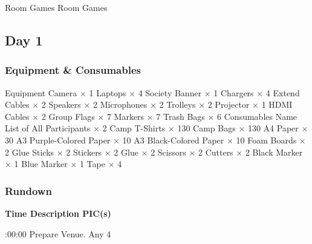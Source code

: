
\bTR\bTD\schetimee{\currentTABLErow}
\eTD\bTD[nr=4] Room Games
\eTD\bTD[nr=4] Room Games
\eTD\eTR


\eTABLEbody
\eTABLE

\pagebreak
\subsection{Day 1}

\subsubsection{Equipment \& Consumables}
\starttabulate[|l|l|]
\NC{}Equipment\NC\NR
\HL
\NC Camera \NC $\times$ 1 \NR
\NC Laptops \NC $\times$ 4 \NR
\NC Society Banner \NC $\times$ 1 \NR
\NC Chargers \NC $\times$ 4 \NR
\NC Extend Cables \NC $\times$ 2 \NR
\NC Speakers \NC $\times$ 2 \NR
\NC Microphones \NC $\times$ 2 \NR
\NC Trolleys \NC $\times$ 2 \NR
\NC Projector \NC $\times$ 1 \NR
\NC HDMI Cables \NC $\times$ 2 \NR
\NC Group Flags \NC $\times$ 7 \NR
\NC Markers \NC $\times$ 7 \NR
\NC Trash Bags \NC $\times$ 6 \NR
\HL
\NR
\NC{}Consumables\NC\NR
\HL
\NC Name List of All Participants \NC $\times$ 2 \NR
\NC Camp T-Shirts \NC $\times$ 130 \NR
\NC Camp Bags \NC $\times$ 130 \NR
\NC A4 Paper \NC $\times$ 30 \NR
\NC A3 Purple-Colored Paper \NC $\times$ 10 \NR
\NC A3 Black-Colored Paper \NC $\times$ 10 \NR
\NC Foam Boards \NC $\times$ 2 \NR
\NC Glue Sticks \NC $\times$ 2 \NR
\NC Stickers \NC $\times$ 2 \NR
\NC Glue \NC $\times$ 2 \NR
\NC Scissors \NC $\times$ 2 \NR
\NC Cutters \NC $\times$ 2 \NR
\NC Black Marker \NC $\times$ 1 \NR
\NC Blue Marker \NC $\times$ 1 \NR
\NC Tape \NC $\times$ 4 \NR
\HL
\stoptabulate

\subsubsection{Rundown}

\setupTABLE[c][1][width=1.25in]
\setupTABLE[c][2][width=3.5in]
\setupTABLE[c][3][width=1.25in]
\bTABLE[split=no]
\bTABLEhead

\bTR\bTH    \bf{Time}
\eTH\bTH    \bf{Description}
\eTH\bTH    \bf{PIC(s)}
\eTH\eTR

\eTABLEhead
\bTABLEbody

\bTR{}:00:00
\eTD\bTD Prepare Venue.
\eTD\bTD Any 4
\eTD\eTR

